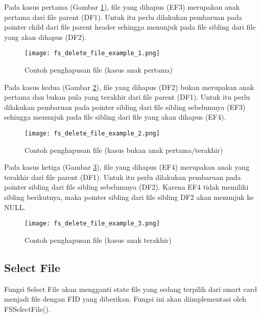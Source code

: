 \documentclass[a4paper, 12pt]{report}
\begin{document}
Pada kasus pertama (Gambar \ref{fig-delete-file-example-1}), file yang dihapus (EF3) merupakan anak pertama dari file parent (DF1). Untuk itu perlu dilakukan pembaruan pada pointer child dari file parent header sehingga menunjuk pada file sibling dari file yang akan dihapus (DF2). 

\begin{figure}
\centering
\texttt{[image: fs\_delete\_file\_example\_1.png]}
\caption{Contoh penghapusan file (kasus anak pertama)}
\label{fig-delete-file-example-1}
\end{figure}

Pada kasus kedua (Gambar \ref{fig-delete-file-example-2}), file yang dihapus (DF2) bukan merupakan anak pertama dan bukan pula yang terakhir dari file parent (DF1). Untuk itu perlu dilakukan pembaruan pada pointer sibling dari file sibling sebelumnya (EF3) sehingga menunjuk pada file sibling dari file yang akan dihapus (EF4). 

\begin{figure}
\centering
\texttt{[image: fs\_delete\_file\_example\_2.png]}
\caption{Contoh penghapusan file (kasus bukan anak pertama/terakhir)}
\label{fig-delete-file-example-2}
\end{figure}

Pada kasus ketiga (Gambar \ref{fig-delete-file-example-3}), file yang dihapus (EF4) merupakan anak yang terakhir dari file parent (DF1). Untuk itu perlu dilakukan pembaruan pada pointer sibling dari file sibling sebelumnya (DF2). Karena EF4 tidak memiliki sibling berikutnya, maka pointer sibling dari file sibling DF2 akan menunjuk ke NULL.

\begin{figure}
\centering
\texttt{[image: fs\_delete\_file\_example\_3.png]}
\caption{Contoh penghapusan file (kasus anak terakhir)}
\label{fig-delete-file-example-3}
\end{figure}


\subsection{Select File}

Fungsi Select File akan mengganti state file yang sedang terpilih dari smart card menjadi file dengan FID yang diberikan. Fungsi ini akan diimplementasi oleh FSSelectFile(). 
\end{document}
